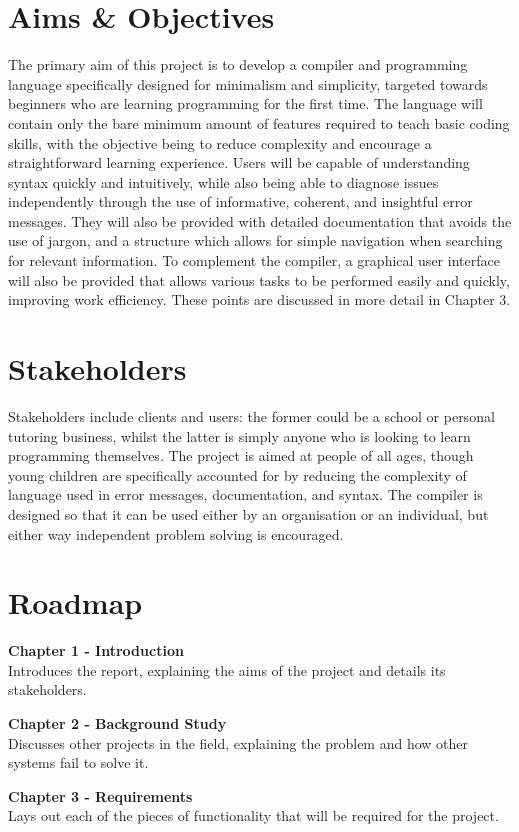 \documentclass[
]{report}
\begin{document}
\section{Aims \& Objectives}
The primary aim of this project is to develop a compiler and programming
language specifically designed for minimalism and simplicity, targeted
towards beginners who are learning programming for the first time. The
language will contain only the bare minimum amount of features required
to teach basic coding skills, with the objective being to reduce
complexity and encourage a straightforward learning experience. Users
will be capable of understanding syntax quickly and intuitively, while
also being able to diagnose issues independently through the use of
informative, coherent, and insightful error messages. They will also be
provided with detailed documentation that avoids the use of jargon, and
a structure which allows for simple navigation when searching for
relevant information. To complement the compiler, a graphical user
interface will also be provided that allows various tasks to be
performed easily and quickly, improving work efficiency. These points
are discussed in more detail in Chapter 3.

\section{Stakeholders}
Stakeholders include clients and users: the former could be a school or
personal tutoring business, whilst the latter is simply anyone who is
looking to learn programming themselves. The project is aimed at people
of all ages, though young children are specifically accounted for by
reducing the complexity of language used in error messages,
documentation, and syntax. The compiler is designed so that it can be
used either by an organisation or an individual, but either way
independent problem solving is encouraged.

\section{Roadmap}
\textbf{Chapter 1 - Introduction}\\
Introduces the report, explaining the aims of the project and details
its stakeholders.

\textbf{Chapter 2 - Background Study}\\
Discusses other projects in the field, explaining the problem and how
other systems fail to solve it.

\textbf{Chapter 3 - Requirements}\\
Lays out each of the pieces of functionality that will be required for
the project.
\end{document}

